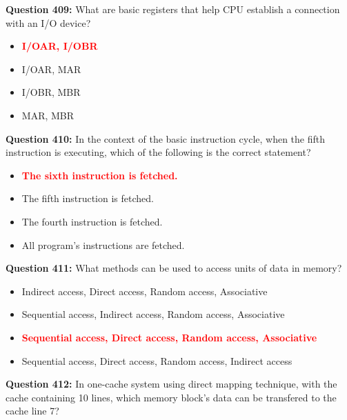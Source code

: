 \documentclass[12pt,a4paper]{article}
\begin{document}
\vspace{0.5cm}

\textbf{Question 409:} What are basic registers that help CPU establish a connection with an I/O device?

\begin{itemize}
    \item[\textbf{A.}] \textcolor{red}{\textbf{I/OAR, I/OBR}}
    \item[\textbf{B.}] I/OAR, MAR
    \item[\textbf{C.}] I/OBR, MBR
    \item[\textbf{D.}] MAR, MBR
\end{itemize}

\vspace{0.5cm}

\textbf{Question 410:} In the context of the basic instruction cycle, when the fifth instruction is executing, which of the following is the correct statement?

\begin{itemize}
    \item[\textbf{A.}] \textcolor{red}{\textbf{The sixth instruction is fetched.}}
    \item[\textbf{B.}] The fifth instruction is fetched.
    \item[\textbf{C.}] The fourth instruction is fetched.
    \item[\textbf{D.}] All program's instructions are fetched.
\end{itemize}

\vspace{0.5cm}

\textbf{Question 411:} What methods can be used to access units of data in memory?

\begin{itemize}
    \item[\textbf{A.}] Indirect access, Direct access, Random access, Associative
    \item[\textbf{B.}] Sequential access, Indirect access, Random access, Associative
    \item[\textbf{C.}] \textcolor{red}{\textbf{Sequential access, Direct access, Random access, Associative}}
    \item[\textbf{D.}] Sequential access, Direct access, Random access, Indirect access
\end{itemize}

\vspace{0.5cm}

\textbf{Question 412:} In one-cache system using direct mapping technique, with the cache containing 10 lines, which memory block's data can be transfered to the cache line 7?
\end{document}
